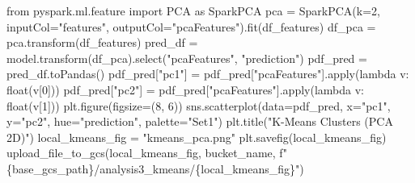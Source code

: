 \documentclass[
  letterpaper,
  DIV=11,
  numbers=noendperiod]{scrartcl}
\newenvironment{Shaded}{\begin{snugshade}}{\end{snugshade}}
\newcommand{\BuiltInTok}[1]{\textcolor[rgb]{0.98,0.46,0.51}{#1}}
\newcommand{\DecValTok}[1]{\textcolor[rgb]{0.47,0.72,1.00}{#1}}
\newcommand{\ImportTok}[1]{\textcolor[rgb]{0.62,0.80,1.00}{#1}}
\newcommand{\KeywordTok}[1]{\textcolor[rgb]{0.98,0.46,0.51}{#1}}
\newcommand{\NormalTok}[1]{\textcolor[rgb]{0.88,0.89,0.91}{#1}}
\newcommand{\OperatorTok}[1]{\textcolor[rgb]{0.88,0.89,0.91}{#1}}
\newcommand{\SpecialCharTok}[1]{\textcolor[rgb]{0.47,0.72,1.00}{#1}}
\newcommand{\SpecialStringTok}[1]{\textcolor[rgb]{0.62,0.80,1.00}{#1}}
\newcommand{\StringTok}[1]{\textcolor[rgb]{0.62,0.80,1.00}{#1}}
\begin{document}
\begin{Shaded}
\begin{Highlighting}[]
    \ImportTok{from}\NormalTok{ pyspark.ml.feature }\ImportTok{import}\NormalTok{ PCA }\ImportTok{as}\NormalTok{ SparkPCA}
\NormalTok{    pca }\OperatorTok{=}\NormalTok{ SparkPCA(k}\OperatorTok{=}\DecValTok{2}\NormalTok{, inputCol}\OperatorTok{=}\StringTok{"features"}\NormalTok{, outputCol}\OperatorTok{=}\StringTok{"pcaFeatures"}\NormalTok{).fit(df\_features)}
\NormalTok{    df\_pca }\OperatorTok{=}\NormalTok{ pca.transform(df\_features)}
\NormalTok{    pred\_df }\OperatorTok{=}\NormalTok{ model.transform(df\_pca).select(}\StringTok{"pcaFeatures"}\NormalTok{, }\StringTok{"prediction"}\NormalTok{)}
\NormalTok{    pdf\_pred }\OperatorTok{=}\NormalTok{ pred\_df.toPandas()}
\NormalTok{    pdf\_pred[}\StringTok{"pc1"}\NormalTok{] }\OperatorTok{=}\NormalTok{ pdf\_pred[}\StringTok{"pcaFeatures"}\NormalTok{].}\BuiltInTok{apply}\NormalTok{(}\KeywordTok{lambda}\NormalTok{ v: }\BuiltInTok{float}\NormalTok{(v[}\DecValTok{0}\NormalTok{]))}
\NormalTok{    pdf\_pred[}\StringTok{"pc2"}\NormalTok{] }\OperatorTok{=}\NormalTok{ pdf\_pred[}\StringTok{"pcaFeatures"}\NormalTok{].}\BuiltInTok{apply}\NormalTok{(}\KeywordTok{lambda}\NormalTok{ v: }\BuiltInTok{float}\NormalTok{(v[}\DecValTok{1}\NormalTok{]))}
\NormalTok{    plt.figure(figsize}\OperatorTok{=}\NormalTok{(}\DecValTok{8}\NormalTok{, }\DecValTok{6}\NormalTok{))}
\NormalTok{    sns.scatterplot(data}\OperatorTok{=}\NormalTok{pdf\_pred, x}\OperatorTok{=}\StringTok{"pc1"}\NormalTok{, y}\OperatorTok{=}\StringTok{"pc2"}\NormalTok{, hue}\OperatorTok{=}\StringTok{"prediction"}\NormalTok{, palette}\OperatorTok{=}\StringTok{"Set1"}\NormalTok{)}
\NormalTok{    plt.title(}\StringTok{"K{-}Means Clusters (PCA 2D)"}\NormalTok{)}
\NormalTok{    local\_kmeans\_fig }\OperatorTok{=} \StringTok{"kmeans\_pca.png"}
\NormalTok{    plt.savefig(local\_kmeans\_fig)}
\NormalTok{    upload\_file\_to\_gcs(local\_kmeans\_fig, bucket\_name, }\SpecialStringTok{f"}\SpecialCharTok{\{}\NormalTok{base\_gcs\_path}\SpecialCharTok{\}}\SpecialStringTok{/analysis3\_kmeans/}\SpecialCharTok{\{}\NormalTok{local\_kmeans\_fig}\SpecialCharTok{\}}\SpecialStringTok{"}\NormalTok{)}


\end{Highlighting}
\end{Shaded}
\end{document}
